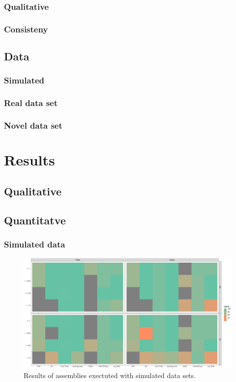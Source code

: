 \subsubsection{Qualitative}
\subsubsection{Consisteny}


\subsection{Data}
\subsubsection{Simulated}
\subsubsection{Real data set}
\subsubsection{Novel data set}


\section{Results}
\subsection{Qualitative}

\subsection{Quantitatve}
\subsubsection{Simulated data}
\begin{figure}[H]
\centering
\includegraphics[height=.45\textheight, width=.95\textwidth]{Figures/sim_tiles}
\decoRule
\caption[Score of assemblies of simulated data sets]{Results of assemblies exectuted with simulated data sets.}
\label{fig:sim_tiles}
\end{figure}

